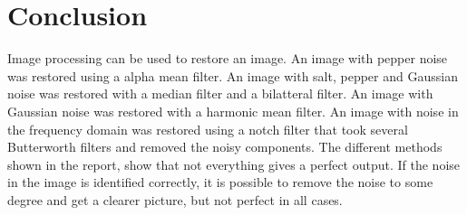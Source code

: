 \section{Conclusion}

Image processing can be used to restore an image.
An image with pepper noise was restored using a alpha mean filter.
An image with salt, pepper and Gaussian noise was restored with a median filter and a bilatteral filter.
An image with Gaussian noise was restored with a harmonic mean filter.
An image with noise in the frequency domain was restored using a notch filter that took several Butterworth filters and removed the noisy components.
The different methods shown in the report, show that not everything gives a perfect output.
If the noise in the image is identified correctly, it is possible to remove the noise to some degree and get a clearer picture, but not perfect in all cases.